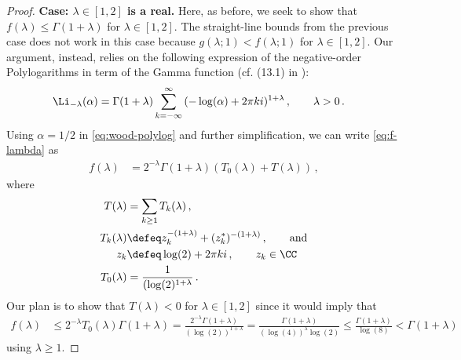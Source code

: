 \begin{proof}
    \noindent
    \textbf{Case: $\lambda \in [1, 2]$ is a real.}
    Here, as before, we seek to show that $f(\lambda) \leq \Gamma(1+\lambda)$ for $\lambda \in [1,2]$. 
    The straight-line bounds from the previous case does not work in this case 
    because $g(\lambda; 1) < f(\lambda; 1)$ for $\lambda \in [1, 2]$. 
    Our argument, instead, relies on the following expression of the negative-order Polylogarithms 
    in term of the Gamma function (cf. (13.1) in \cite{wood1992polylog}):
    \begin{align}\label{eq:wood-polylog}
        \Li_{-\lambda}(\alpha) &= \Gamma(1+\lambda) \sum_{k = -\infty}^\infty{ (- \log(\alpha) + 2 \pi k i)^{1+\lambda}}
        \, , \qquad \lambda > 0
        \, .
    \end{align}
    Using $\alpha = 1/2$ in \eqref{eq:wood-polylog} and further simplification, we can write \eqref{eq:f-lambda} as
    \begin{align}\label{eq:f-lambda-T}
        f(\lambda) &= 2^{-\lambda}\Gamma(1+\lambda) \left( T_0(\lambda) + T(\lambda) \right)
        \, ,
    \end{align}
    where
    \begin{align*}
        T(\lambda) &= \sum_{k \geq 1}{T_k(\lambda)}\, , \\
        T_k(\lambda) &\defeq z_k^{-(1+\lambda)} + (z_k^*)^{-(1+\lambda)}\, , \qquad \text{and} \\
        z_k &\defeq \log(2) + 2\pi k i\, , \qquad z_k \in \CC \\
        T_0(\lambda) &= \frac{1}{(\log(2)^{1+\lambda}}
        \, .
    \end{align*}
    Our plan is to show that $T(\lambda) < 0$ for $\lambda \in [1,2]$ 
    since it would imply that
    \begin{align*}
        f(\lambda) 
        &\leq 2^{-\lambda} T_0(\lambda) \Gamma(1+\lambda)
        = \frac{2^{-\lambda} \Gamma(1+\lambda)}{ (\log(2))^{1+\lambda} }  
        = \frac{\Gamma(1+\lambda)}{(\log(4))^\lambda \log(2)} 
        \leq \frac{\Gamma(1+\lambda)}{\log(8)}
        < \Gamma(1+\lambda)
    \end{align*}
    using $\lambda \geq 1$.


\end{proof}
